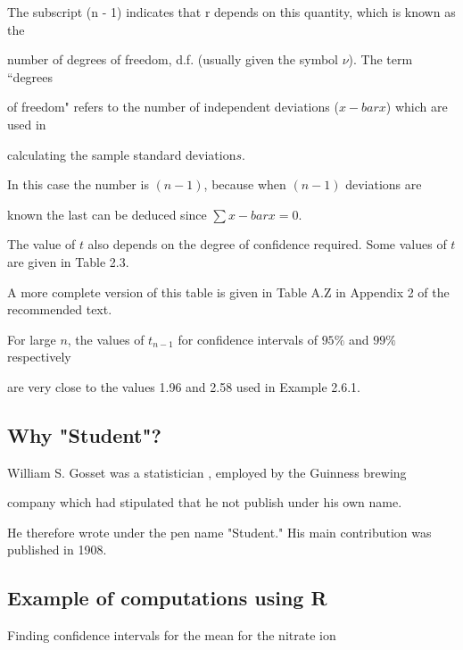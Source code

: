 



The subscript (n - 1) indicates that r depends on this quantity, which is known as the

number of degrees of freedom, d.f. (usually given the symbol $\nu$). The term ``degrees

of freedom" refers to the number of independent deviations ($x-bar{x}$) which are used in

calculating the sample standard deviation$s$.

 

In this case the number is $(n- 1)$, because when $(n - 1)$ deviations are

known the last can be deduced since $\sum x-bar{x} = 0$.

 

The value of $t$ also depends on the degree of confidence required. Some values of $t$ are given in Table 2.3.

A more complete version of this table is given in Table A.Z in Appendix 2 of the recommended text.

 

For large $n$, the values of $t_{n-1}$ for confidence intervals of $95\%$ and $99\%$ respectively

are very close to the values 1.96 and 2.58 used in Example 2.6.1.

 







\subsection{Why "Student"?}

 

William S. Gosset was a statistician , employed by the Guinness brewing

company which had stipulated that he not publish under his own name.

He therefore wrote under the pen name "Student." His main contribution was published in 1908.

 

\subsection{Example of computations using R}

Finding confidence intervals for the mean for the nitrate ion

